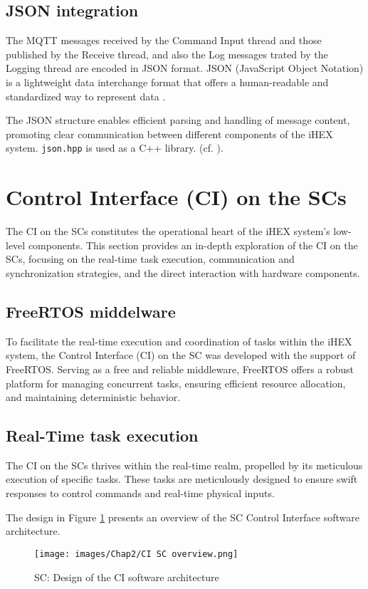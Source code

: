 \subsection{JSON integration}
The MQTT messages received by the Command Input thread and those published by the Receive thread, and also the Log messages trated by the Logging thread are encoded in JSON format. JSON (JavaScript Object Notation) is a lightweight data interchange format that offers a human-readable and standardized way to represent data \cite{R26}. 

The JSON structure enables efficient parsing and handling of message content, promoting clear communication between different components of the iHEX system. \texttt{json.hpp} is used as a C++ library. (cf. \cite{R3}).

\section{Control Interface (CI) on the SCs}
The CI on the SCs constitutes the operational heart of the iHEX system's low-level components. This section provides an in-depth exploration of the CI on the SCs, focusing on the real-time task execution, communication and synchronization strategies, and the direct interaction with hardware components.

\subsection{FreeRTOS middelware} 
To facilitate the real-time execution and coordination of tasks within the iHEX system, the Control Interface (CI) on the SC was developed with the support of FreeRTOS. Serving as a free and reliable middleware, FreeRTOS offers a robust platform for managing concurrent tasks, ensuring efficient resource allocation, and maintaining deterministic behavior. \cite{R27}

\subsection{Real-Time task execution}
The CI on the SCs thrives within the real-time realm, propelled by its meticulous execution of specific tasks. These tasks are meticulously designed to ensure swift responses to control commands and real-time physical inputs.

The design in Figure \ref{SC: design CI} presents an overview of the SC Control Interface software architecture.

\begin{figure}[H]
\begin{center}
\texttt{[image: images/Chap2/CI SC overview.png]}\\
\caption{SC: Design of the CI software architecture}
\label{SC: design CI}
\end{center}
\end{figure}

